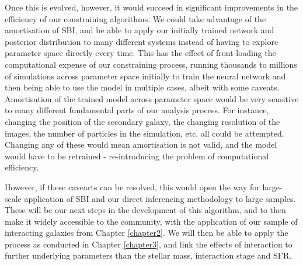 Once this is evolved, however, it would succeed in significant improvements in the efficiency of our constraining algorithms. We could take advantage of the amortisation of SBI, and be able to apply our initially trained network and posterior distribution to many different systems instead of having to explore parameter space directly every time. This has the effect of front-loading the computational expense of our constraining process, running thousands to millions of simulations across parameter space initially to train the neural network and then being able to use the model in multiple cases, albeit with some caveats. Amortisation of the trained model across parameter space would be very sensitive to many different fundamental parts of our analysis process. For instance, changing the position of the secondary galaxy, the changing resolution of the images, the number of particles in the simulation, etc, all could be attempted. Changing any of these would mean amortisation is not valid, and the model would have to be retrained - re-introducing the problem of computational efficiency. 

However, if these cavearts can be resolved, this would open the way for large-scale application of SBI and our direct inferencing methodology to large samples. These will be our next steps in the development of this algorithm, and to then make it widely accessible to the community, with the application of our sample of interacting galaxies from Chapter \ref{chapter2}. We will then be able to apply the process as conducted in Chapter \ref{chapter3}, and link the effects of interaction to further underlying parameters than the stellar mass, interaction stage and SFR.